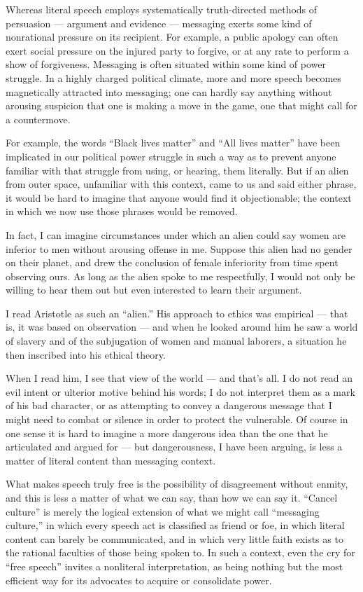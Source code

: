 Whereas literal speech employs systematically truth-directed methods of
persuasion --- argument and evidence --- messaging exerts some kind of
nonrational pressure on its recipient. For example, a public apology can
often exert social pressure on the injured party to forgive, or at any
rate to perform a show of forgiveness. Messaging is often situated
within some kind of power struggle. In a highly charged political
climate, more and more speech becomes magnetically attracted into
messaging; one can hardly say anything without arousing suspicion that
one is making a move in the game, one that might call for a countermove.

For example, the words ``Black lives matter'' and ``All lives matter''
have been implicated in our political power struggle in such a way as to
prevent anyone familiar with that struggle from using, or hearing, them
literally. But if an alien from outer space, unfamiliar with this
context, came to us and said either phrase, it would be hard to imagine
that anyone would find it objectionable; the context in which we now use
those phrases would be removed.

In fact, I can imagine circumstances under which an alien could say
women are inferior to men without arousing offense in me. Suppose this
alien had no gender on their planet, and drew the conclusion of female
inferiority from time spent observing ours. As long as the alien spoke
to me respectfully, I would not only be willing to hear them out but
even interested to learn their argument.

I read Aristotle as such an ``alien.'' His approach to ethics was
empirical --- that is, it was based on observation --- and when he
looked around him he saw a world of slavery and of the subjugation of
women and manual laborers, a situation he then inscribed into his
ethical theory.

When I read him, I see that view of the world --- and that's all. I do
not read an evil intent or ulterior motive behind his words; I do not
interpret them as a mark of his bad character, or as attempting to
convey a dangerous message that I might need to combat or silence in
order to protect the vulnerable. Of course in one sense it is hard to
imagine a more dangerous idea than the one that he articulated and
argued for --- but dangerousness, I have been arguing, is less a matter
of literal content than messaging context.

What makes speech truly free is the possibility of disagreement without
enmity, and this is less a matter of what we can say, than how we can
say it. ``Cancel culture'' is merely the logical extension of what we
might call ``messaging culture,'' in which every speech act is
classified as friend or foe, in which literal content can barely be
communicated, and in which very little faith exists as to the rational
faculties of those being spoken to. In such a context, even the cry for
``free speech'' invites a nonliteral interpretation, as being nothing
but the most efficient way for its advocates to acquire or consolidate
power.


